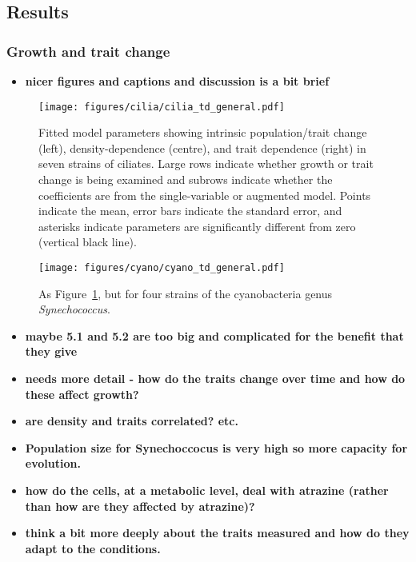 \documentclass[
  letterpaper,
  DIV=11,
  numbers=noendperiod]{scrartcl}
\providecommand{\tightlist}{%
  \setlength{\itemsep}{0pt}\setlength{\parskip}{0pt}}\usepackage{longtable,booktabs,array}
\begin{document}
\subsection{Results}\label{sec-DAE_results}

\subsubsection{Growth and trait change}\label{growth-and-trait-change}

\begin{itemize}
\tightlist
\item
  \textbf{nicer figures and captions and discussion is a bit brief}
\end{itemize}

\begin{figure}

{\centering \texttt{[image: figures/cilia/cilia\_td\_general.pdf]}

}

\caption{\label{fig-cilia_td_general}Fitted model parameters showing
intrinsic population/trait change (left), density-dependence (centre),
and trait dependence (right) in seven strains of ciliates. Large rows
indicate whether growth or trait change is being examined and subrows
indicate whether the coefficients are from the single-variable or
augmented model. Points indicate the mean, error bars indicate the
standard error, and asterisks indicate parameters are significantly
different from zero (vertical black line).}

\end{figure}

\begin{figure}

{\centering \texttt{[image: figures/cyano/cyano\_td\_general.pdf]}

}

\caption{\label{fig-cyano_td_general}As
Figure~\ref{fig-cilia_td_general}, but for four strains of the
cyanobacteria genus \emph{Synechococcus}.}

\end{figure}

\begin{itemize}
\tightlist
\item
  \textbf{maybe 5.1 and 5.2 are too big and complicated for the benefit
  that they give}
\item
  \textbf{needs more detail - how do the traits change over time and how
  do these affect growth?}
\item
  \textbf{are density and traits correlated? etc.}
\item
  \textbf{Population size for Synechoccocus is very high so more
  capacity for evolution.}
\item
  \textbf{how do the cells, at a metabolic level, deal with atrazine
  (rather than how are they affected by atrazine)?}
\item
  \textbf{think a bit more deeply about the traits measured and how do
  they adapt to the conditions.}
\end{itemize}
\end{document}
